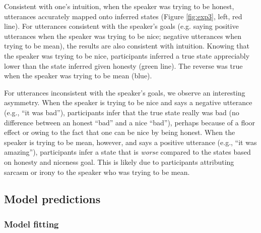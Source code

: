 \documentclass[10pt,letterpaper]{article}
\begin{document}
Consistent with one's intuition, when the speaker was trying to be honest, utterances accurately mapped onto inferred states (Figure \ref{fig:exp3}, left, red line).
For utterances consistent with the speaker's goals (e.g. saying positive utterances when the speaker was trying to be nice; negative utterances when trying to be mean), the results are also consistent with intuition.
Knowing that the speaker was trying to be nice, participants inferred a true state appreciably lower than the state inferred given honesty (green line).
The reverse was true when the speaker was trying to be mean (blue).


For utterances inconsistent with the speaker's goals, we observe an interesting asymmetry.
When the speaker is trying to be nice and says a negative utterance (e.g., ``it was bad''), participants infer that the true state really was bad (no difference between an honest ``bad'' and a nice ``bad''), perhaps because of a floor effect or owing to the fact that one can be nice by being honest.
When the speaker is trying to be mean, however, and says a positive utterance (e.g., ``it was amazing''), participants infer a state that is \emph{worse} compared to the states based on honesty and niceness goal.
This is likely due to participants attributing sarcasm or irony to the speaker who was trying to be mean.


\subsection{Model predictions}


\subsubsection{Model fitting}
\end{document}
